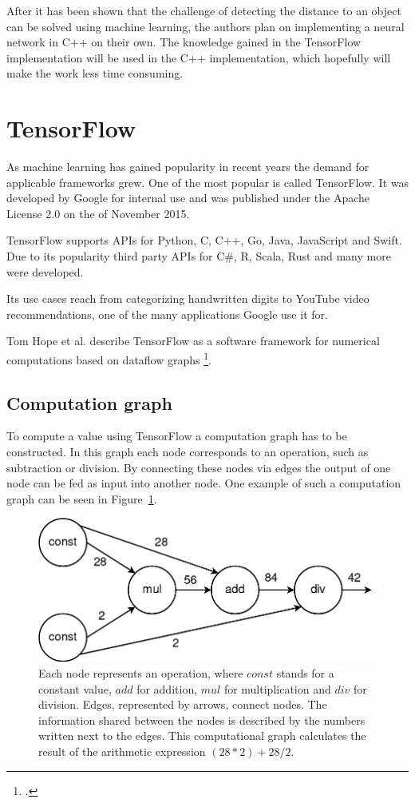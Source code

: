 After it has been shown that the challenge of detecting the distance to an object can be solved using machine learning, the authors plan on implementing a neural network in C++ on their own. The knowledge gained in the TensorFlow implementation will be used in the C++ implementation, which hopefully will make the work less time consuming.

\section{TensorFlow}
As machine learning has gained popularity in recent years the demand for applicable frameworks grew. One of the most popular is called TensorFlow. It was developed by Google for internal use and was published under the Apache License 2.0 on the  of November 2015.

TensorFlow supports APIs for Python, C, C++, Go, Java, JavaScript and Swift.
Due to its popularity third party APIs for C\#, R, Scala, Rust and many more were developed.

Its use cases reach from categorizing handwritten digits to YouTube video recommendations, one of the many applications Google use it for.

Tom Hope et al. describe TensorFlow as a software framework for numerical computations based on dataflow graphs \footcite[page 6]{Hope_Learning_TensorFlow}.

\subsection{Computation graph}
To compute a value using TensorFlow a computation graph has to be constructed. In this graph each node corresponds to an operation, such as subtraction or division. By connecting these nodes via edges the output of one node can be fed as input into another node. One example of such a computation graph can be seen in Figure~\ref{pic:implementation_tensorflow_nodesAndGraphs_computationGraph}.

\begin{figure}[h!]
	\centering
	\includegraphics[width=4.5in]{img/implementation_tensorflow_nodesAndGraphs_computationGraph.png}
	\caption{Each node represents an operation, where $const$ stands for a constant value, $add$ for addition, $mul$ for multiplication and $div$ for division. Edges, represented by arrows, connect nodes. The information shared between the nodes is described by the numbers written next to the edges. This computational graph calculates the result of the arithmetic expression $(28 * 2) + 28 / 2$.}
	\label{pic:implementation_tensorflow_nodesAndGraphs_computationGraph}
\end{figure}

